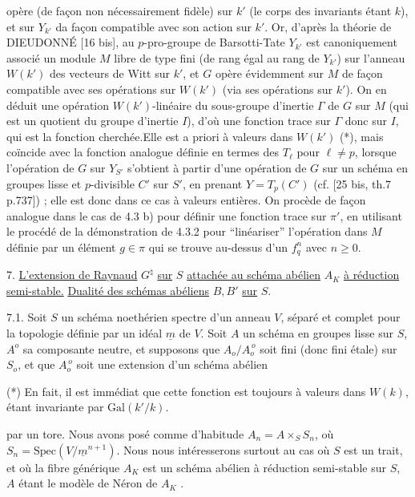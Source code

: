 
opère (de façon non nécessairement fidèle) sur $k'$ (le corps des invariants étant $k$), et sur $Y_{k'}$ da façon compatible avec son action sur $k'$. Or, d'après la théorie de DIEUDONNÉ [16 bis], au $p$-pro-groupe de Barsotti-Tate $Y_{k'}$ est canoniquement associé  un module $M$ libre de type fini (de rang égal au rang de $Y_{k'}$) sur l'anneau $W(k')$ des vecteurs de Witt sur $k'$, et $G$ opère évidemment sur $M$ de façon compatible avec ses opérations sur $W(k')$ (via ses opérations sur $k'$). On en déduit une opération $W(k')$-linéaire du sous-groupe d'inertie $\Gamma$ de $G$ sur $M$ (qui est un quotient du groupe d'inertie $I$), d'où une fonction trace sur $\Gamma$ donc sur $I$, qui est la fonction cherchée.Elle est a priori à valeurs dans $W(k')$ (*), mais coïncide avec la fonction analogue définie en termes des $T_\ell$ pour $\ell \neq p$, lorsque l'opération de $G$ sur $Y_{S'}$ s'obtient à partir d'une opération de $G$ sur un schéma en groupes lisse et $p$-divisible $C'$ sur $S'$, en prenant $Y = T_p(C')$ (cf. [25 bis, th.7 p.737]) ; elle est donc dans ce cas à valeurs entières. On procède de façon analogue dans le cas de 4.3 b) pour définir une fonction trace sur $\pi'$, en utilisant le procédé de la démonstration de 4.3.2 pour ``linéariser'' l'opération dans $M$ définie par un élément $g \in \pi$ qui se trouve au-dessus d'un $f_q^n$ avec $n \geqslant 0$.


7. \underline{L'extension de Raynaud} $G^\natural$ \underline{sur} $S$ \underline{attachée au schéma abélien} $A_K$ \underline{à réduction semi-stable.} \underline{Dualité des schémas abéliens} $B,B'$ \underline{sur} $S$.

7.1.  Soit $S$ un schéma noethérien spectre d'un anneau $V$, séparé et complet pour la topologie définie par un idéal $\underline{m}$ de $V$. Soit $A$ un schéma en groupes lisse sur $S$, $A^o$ sa composante neutre, et supposons que $A_o/A_o^{\,o}$ soit fini (donc fini étale) sur $S_o$, et que $A_o^{\,o}$ soit une extension d'un schéma abélien

(*) En fait, il est immédiat que cette fonction est toujours à valeurs dans $W(k)$, étant invariante par $\mathrm{Gal}(k'/k)$.



par un tore. Nous avons posé comme d'habitude $A_n = A\times_S S_n$, où $S_n = \mathrm{Spec}(V/\underline{m}^{n+1})$. Nous nous intéresserons surtout au cas où $S$ est un trait, et où la fibre générique $A_K$ est un schéma abélien à réduction semi-stable sur $S$, $A$ étant le modèle de Néron de $A_K$ .

